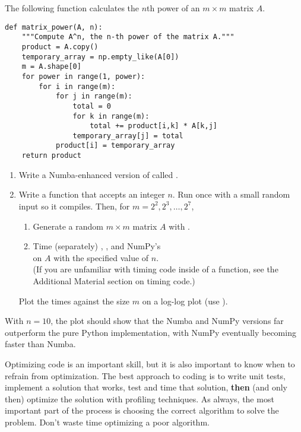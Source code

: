 \begin{problem} %
The following function calculates the $n$th power of an $m\times m$ matrix $A$.

\begin{lstlisting}
def matrix_power(A, n):
    """Compute A^n, the n-th power of the matrix A."""
    product = A.copy()
    temporary_array = np.empty_like(A[0])
    m = A.shape[0]
    for power in range(1, power):
        for i in range(m):
            for j in range(m):
                total = 0
                for k in range(m):
                    total += product[i,k] * A[k,j]
                temporary_array[j] = total
            product[i] = temporary_array
    return product
\end{lstlisting}

\begin{enumerate}
\item Write a Numba-enhanced version of  called .
\item Write a function that accepts an integer $n$.
Run  once with a small random input so it compiles.
Then, for $m=2^2,2^3,\ldots,2^7$,
    \begin{enumerate}
        \item Generate a random $m\times m$ matrix $A$ with .
        \item Time (separately) , , and NumPy's \\  on $A$ with the specified value of $n$.
        \\(If you are unfamiliar with timing code inside of a function, see the \\ Additional Material section on timing code.)
    \end{enumerate}
Plot the times against the size $m$ on a log-log plot (use ).
\end{enumerate}
With $n=10$, the plot should show that the Numba and NumPy versions far outperform the pure Python implementation, with NumPy eventually becoming faster than Numba.
\end{problem}

\begin{warn}
Optimizing code is an important skill, but it is also important to know when to refrain from optimization.
The best approach to coding is to write unit tests, implement a solution that works, test and time that solution, \textbf{then} (and only then) optimize the solution with profiling techniques.
As always, the most important part of the process is choosing the correct algorithm to solve the problem.
Don't waste time optimizing a poor algorithm.
\end{warn}

